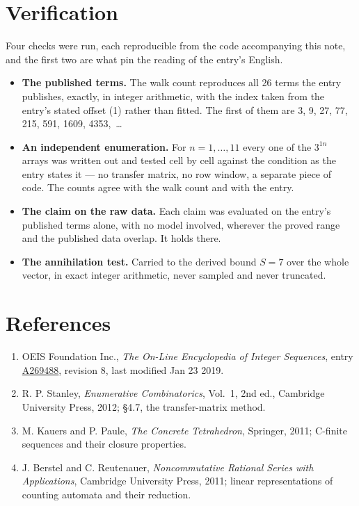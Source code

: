 \documentclass[11pt]{article}
\theoremstyle{definition}
\begin{document}
\section{Verification}

Four checks were run, each reproducible from the code accompanying this note, and the first two are what pin the reading of the entry's English.

\begin{itemize}

\item {\bfseries The published terms.} The walk count reproduces all 26 terms the entry publishes, exactly, in integer arithmetic, with the index taken from the entry's stated offset (1) rather than fitted. The first of them are 3, 9, 27, 77, 215, 591, 1609, 4353,~\dots

\item {\bfseries An independent enumeration.} For $n = 1,\dots,11$ every one of the $3^{1n}$ arrays was written out and tested cell by cell against the condition as the entry states it --- no transfer matrix, no row window, a separate piece of code. The counts agree with the walk count and with the entry.

\item {\bfseries The claim on the raw data.} Each claim was evaluated on the entry's published terms alone, with no model involved, wherever the proved range and the published data overlap. It holds there.

\item {\bfseries The annihilation test.} Carried to the derived bound $S = 7$ over the whole vector, in exact integer arithmetic, never sampled and never truncated.

\end{itemize}

\section{References}

\begin{enumerate}

\item OEIS Foundation Inc., \emph{The On-Line Encyclopedia of Integer Sequences}, entry \href{https://oeis.org/A269488}{A269488}, revision 8, last modified Jan 23 2019.

\item R. P. Stanley, \emph{Enumerative Combinatorics}, Vol.~1, 2nd ed., Cambridge University Press, 2012; \S4.7, the transfer-matrix method.

\item M. Kauers and P. Paule, \emph{The Concrete Tetrahedron}, Springer, 2011; C-finite sequences and their closure properties.

\item J. Berstel and C. Reutenauer, \emph{Noncommutative Rational Series with Applications}, Cambridge University Press, 2011; linear representations of counting automata and their reduction.

\end{enumerate}
\end{document}
